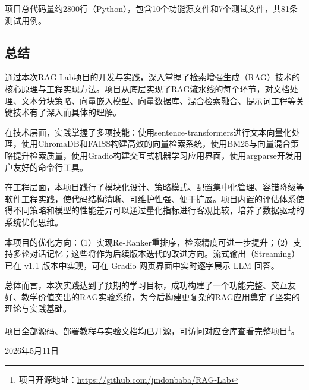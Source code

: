 \documentclass[10pt,a4paper]{article}
\begin{document}
项目总代码量约2800行（Python），包含10个功能源文件和7个测试文件，共81条测试用例。

\subsection{总结}

通过本次RAG-Lab项目的开发与实践，深入掌握了检索增强生成（RAG）技术的核心原理与工程实现方法。项目从底层实现了RAG流水线的每个环节，对文档处理、文本分块策略、向量嵌入模型、向量数据库、混合检索融合、提示词工程等关键技术有了深入而具体的理解。

在技术层面，实践掌握了多项技能：使用sentence-transformers进行文本向量化处理，使用ChromaDB和FAISS构建高效的向量检索系统，使用BM25与向量混合策略提升检索质量，使用Gradio构建交互式机器学习应用界面，使用argparse开发用户友好的命令行工具。

在工程层面，本项目践行了模块化设计、策略模式、配置集中化管理、容错降级等软件工程实践，使代码结构清晰、可维护性强、便于扩展。项目内置的评估体系使得不同策略和模型的性能差异可以通过量化指标进行客观比较，培养了数据驱动的系统优化思维。

本项目的优化方向：（1）实现Re-Ranker重排序，检索精度可进一步提升；（2）支持多轮对话记忆；这些将作为后续版本迭代的改进方向。流式输出（Streaming）已在 v1.1 版本中实现，可在 Gradio 网页界面中实时逐字展示 LLM 回答。

总体而言，本次实践达到了预期的学习目标，成功构建了一个功能完整、交互友好、教学价值突出的RAG实验系统，为今后构建更复杂的RAG应用奠定了坚实的理论与实践基础。

项目全部源码、部署教程与实验文档均已开源，可访问对应仓库查看完整项目\footnote{项目开源地址：\url{https://github.com/jmdonbaba/RAG-Lab}}。



\begin{flushright}
\vspace{2\baselineskip}

{\large 2026年5月11日}

\end{flushright}
\end{document}
